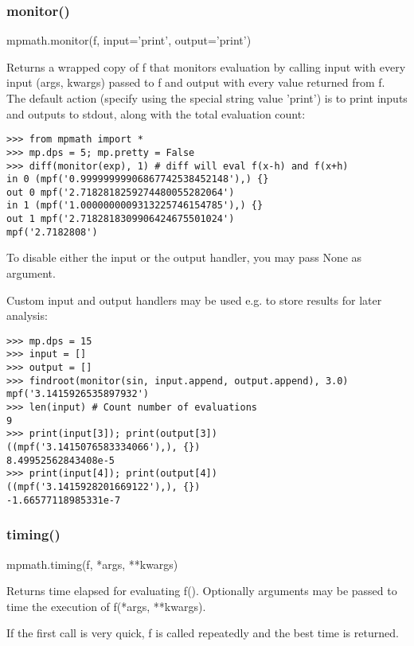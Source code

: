 \subsubsection{monitor()}

mpmath.monitor(f, input='print', output='print')

\vpara
Returns a wrapped copy of f that monitors evaluation by calling input with every input (args, kwargs) passed to f and output with every value returned from f. The default action (specify using the special string value 'print') is to print inputs and outputs to stdout, along with the total evaluation count:

\begin{lstlisting}
>>> from mpmath import *
>>> mp.dps = 5; mp.pretty = False
>>> diff(monitor(exp), 1) # diff will eval f(x-h) and f(x+h)
in 0 (mpf('0.99999999906867742538452148'),) {}
out 0 mpf('2.7182818259274480055282064')
in 1 (mpf('1.0000000009313225746154785'),) {}
out 1 mpf('2.7182818309906424675501024')
mpf('2.7182808')
\end{lstlisting}


To disable either the input or the output handler, you may pass None as argument.

\vpara
Custom input and output handlers may be used e.g. to store results for later analysis:

\begin{lstlisting}
>>> mp.dps = 15
>>> input = []
>>> output = []
>>> findroot(monitor(sin, input.append, output.append), 3.0)
mpf('3.1415926535897932')
>>> len(input) # Count number of evaluations
9
>>> print(input[3]); print(output[3])
((mpf('3.1415076583334066'),), {})
8.49952562843408e-5
>>> print(input[4]); print(output[4])
((mpf('3.1415928201669122'),), {})
-1.66577118985331e-7
\end{lstlisting}

\subsubsection{timing()}

mpmath.timing(f, *args, **kwargs)

\vpara
Returns time elapsed for evaluating f(). Optionally arguments may be passed to time the execution of f(*args, **kwargs).

\vpara
If the first call is very quick, f is called repeatedly and the best time is returned.















